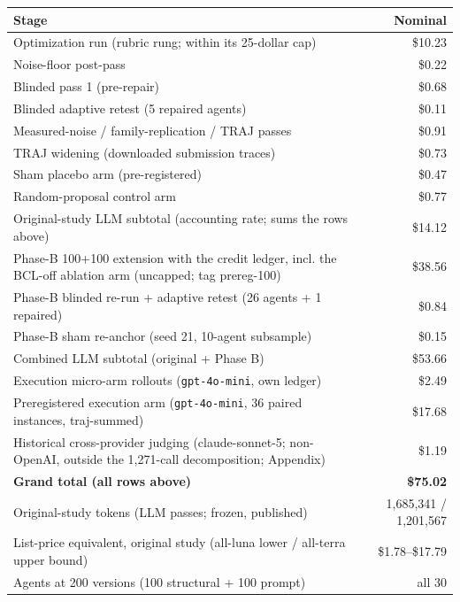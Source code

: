 \begin{tabular}{lr}
\toprule
Stage & Nominal \\
\midrule
Optimization run (rubric rung; within its 25-dollar cap) & \$10.23 \\
Noise-floor post-pass & \$0.22 \\
Blinded pass 1 (pre-repair) & \$0.68 \\
Blinded adaptive retest (5 repaired agents) & \$0.11 \\
Measured-noise / family-replication / TRAJ passes & \$0.91 \\
TRAJ widening (downloaded submission traces) & \$0.73 \\
Sham placebo arm (pre-registered) & \$0.47 \\
Random-proposal control arm & \$0.77 \\
\midrule Original-study LLM subtotal (accounting rate; sums the rows above) & \$14.12 \\
Phase-B 100+100 extension with the credit ledger, incl. the BCL-off ablation arm (uncapped; tag prereg-100) & \$38.56 \\
Phase-B blinded re-run + adaptive retest (26 agents + 1 repaired) & \$0.84 \\
Phase-B sham re-anchor (seed 21, 10-agent subsample) & \$0.15 \\
\midrule Combined LLM subtotal (original + Phase B) & \$53.66 \\
Execution micro-arm rollouts (\texttt{gpt-4o-mini}, own ledger) & \$2.49 \\
Preregistered execution arm (\texttt{gpt-4o-mini}, 36 paired instances, traj-summed) & \$17.68 \\
Historical cross-provider judging (claude-sonnet-5; non-OpenAI, outside the 1{,}271-call decomposition; Appendix) & \$1.19 \\
\midrule \textbf{Grand total (all rows above)} & \textbf{\$75.02} \\
Original-study tokens (LLM passes; frozen, published) & 1,685,341 / 1,201,567 \\
List-price equivalent, original study (all-luna lower / all-terra upper bound) & \$1.78--\$17.79 \\
Agents at 200 versions (100 structural + 100 prompt) & all 30 \\
\bottomrule
\end{tabular}
